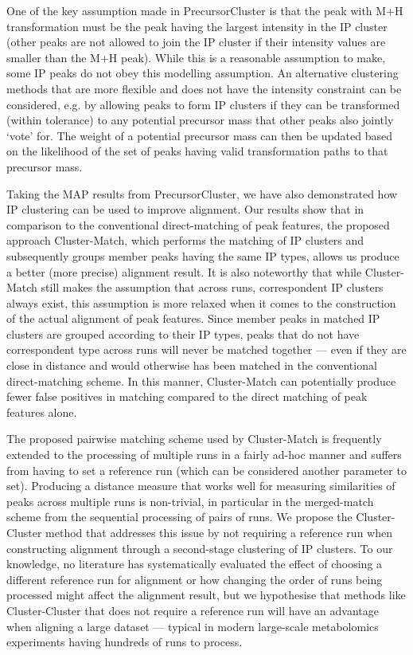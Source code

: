One of the key assumption made in PrecursorCluster is that the peak with M+H transformation must be the peak having the largest intensity in the IP cluster (other peaks are not allowed to join the IP cluster if their intensity values are smaller than the M+H peak). While this is a reasonable assumption to make, some IP peaks do not obey this modelling assumption. An alternative clustering methods that are more flexible and does not have the intensity constraint can be considered, e.g. by allowing peaks to form IP clusters if they can be transformed (within tolerance) to any potential precursor mass that other peaks also jointly `vote' for. The weight of a potential precursor mass can then be updated based on the likelihood of the set of peaks having valid transformation paths to that precursor mass.

Taking the MAP results from PrecursorCluster, we have also demonstrated how IP clustering can be used to improve alignment. Our results show that in comparison to the conventional direct-matching of peak features, the proposed approach Cluster-Match, which performs the matching of IP clusters and subsequently groups member peaks having the same IP types, allows us produce a better (more precise) alignment result. It is also noteworthy that while Cluster-Match still makes the assumption that across runs, correspondent IP clusters always exist, this assumption is more relaxed when it comes to the construction of the actual alignment of peak features. Since member peaks in matched IP clusters are grouped according to their IP types, peaks that do not have correspondent type across runs will never be matched together --- even if they are close in distance and would otherwise has been matched in the conventional direct-matching scheme. In this manner, Cluster-Match can potentially produce fewer false positives in matching compared to the direct matching of peak features alone.

The proposed pairwise matching scheme used by Cluster-Match is frequently extended to the processing of multiple runs in a fairly ad-hoc manner and suffers from having to set a reference run (which can be considered another parameter to set). Producing a distance measure that works well for measuring similarities of peaks across multiple runs is non-trivial, in particular in the merged-match scheme from the sequential processing of pairs of runs. We propose the Cluster-Cluster method that addresses this issue by not requiring a reference run when constructing alignment through a second-stage clustering of IP clusters. To our knowledge, no literature has systematically evaluated the effect of choosing a different reference run for alignment or how changing the order of runs being processed might affect the alignment result, but we hypothesise that methods like Cluster-Cluster that does not require a reference run will have an advantage when aligning a large dataset --- typical in modern large-scale metabolomics experiments having hundreds of runs to process. 

